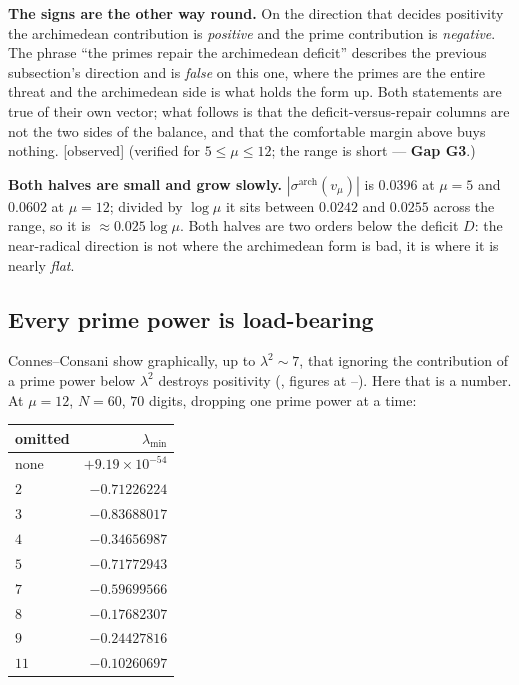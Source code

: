 \documentclass[11pt,a4paper]{article}
\theoremstyle{plain}
\theoremstyle{definition}
\theoremstyle{remark}
\newcommand{\st}[1]{{\normalfont\sffamily\footnotesize[#1]}}
\newcommand{\observed}{\st{observed}}
\newcommand{\file}[1]{\path{#1}}
\begin{document}
\textbf{The signs are the other way round.}  On the direction that decides
positivity the archimedean contribution is \emph{positive} and the prime
contribution is \emph{negative}.  The phrase ``the primes repair the archimedean
deficit'' describes the previous subsection's direction and is \emph{false} on
this one, where the primes are the entire threat and the archimedean side is
what holds the form up.  Both statements are true of their own vector; what
follows is that the deficit-versus-repair columns are not the two sides of the
balance, and that the comfortable margin above buys nothing. \observed{}
(verified for $5\le\mu\le12$; the range is short --- \textbf{Gap G3}.)

\textbf{Both halves are small and grow slowly.}
$|\sigma^{\mathrm{arch}}(v_\mu)|$ is $0.0396$ at $\mu=5$ and $0.0602$ at
$\mu=12$; divided by $\log\mu$ it sits between $0.0242$ and $0.0255$ across the
range, so it is $\approx0.025\log\mu$.  Both halves are two orders below the
deficit $D$: the near-radical direction is not where the archimedean form is
bad, it is where it is nearly \emph{flat}.

\subsection{Every prime power is load-bearing}
\label{sec:loadbearing}

Connes--Consani show graphically, up to $\lambda^2\sim7$, that ignoring the
contribution of a prime power below $\lambda^2$ destroys positivity
(\file{:177}, figures at \file{:576}--\file{:600}).  Here that is a number.  At
$\mu=12$, $N=60$, $70$ digits, dropping one prime power at a time:

\begin{center}\small
\begin{tabular}{@{}lr@{}}
\hline
omitted & $\lambda_{\min}$ \\
\hline
none & $+9.19\times10^{-54}$ \\
$2$ & $-0.71226224$ \\
$3$ & $-0.83688017$ \\
$4$ & $-0.34656987$ \\
$5$ & $-0.71772943$ \\
$7$ & $-0.59699566$ \\
$8$ & $-0.17682307$ \\
$9$ & $-0.24427816$ \\
$11$ & $-0.10260697$ \\
\hline
\end{tabular}
\end{center}
\end{document}
